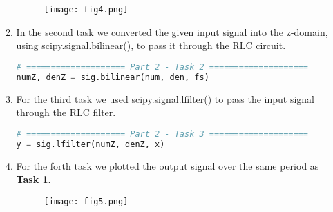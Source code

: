 \documentclass[12pt,a4paper]{article}
\begin{document}
\begin{itemize}
\begin{enumerate}
\begin{figure}[h]
    \centering
    \texttt{[image: fig4.png]}
\end{figure}\textbf{}

    \item
    In the second task we converted the given input signal into the z-domain, using scipy.signal.bilinear(), to pass it through the RLC circuit.\\
    
\begin{lstlisting}[language=Python, caption={Task 2, Part 2}, label={lst:code}, mathescape=true, breaklines=true]
# ==================== Part 2 - Task 2 ====================
numZ, denZ = sig.bilinear(num, den, fs)
\end{lstlisting}
\clearpage

    \item
    For the third task we used scipy.signal.lfilter() to pass the input signal through the RLC filter.\\
 
\begin{lstlisting}[language=Python, caption={Task 3, Part 2}, label={lst:code}, mathescape=true, breaklines=true]
# ==================== Part 2 - Task 3 ====================
y = sig.lfilter(numZ, denZ, x)
\end{lstlisting}  

    \item
    For the forth task we plotted the output signal over the same period as \textbf{Task 1}.
    
\begin{figure}[h]
    \centering
    \texttt{[image: fig5.png]}
\end{figure}\textbf{}
\end{enumerate}   
\end{itemize}

\end{document}
